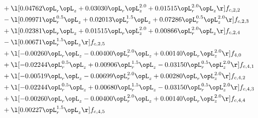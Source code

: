 \begin{alignat}{2}
& + \l[  0.04762 \opL_r \opL_z +  0.03030 \opL_r \opL_z^{2.0} +  0.01515 \opL_r^{2.0} \opL_z  \r] f_{c,2,2} \nonumber \\ 
& - \l[  0.09971 \opL_r^{0.5} \opL_z +  0.02013 \opL_r^{1.5} \opL_z +  0.07286 \opL_r^{0.5} \opL_z^{2.0}  \r] f_{c,2,3} \nonumber \\ 
& + \l[  0.02381 \opL_r \opL_z +  0.01515 \opL_r \opL_z^{2.0} +  0.00866 \opL_r^{2.0} \opL_z  \r] f_{c,2,4} \nonumber \\ 
& - \l[  0.00671 \opL_r^{1.5} \opL_z  \r] f_{c,2,5} \nonumber \\ 
& + \l[  -0.00260 \opL_r \opL_z   -0.00400 \opL_r^{2.0} \opL_z +  0.00140 \opL_r \opL_z^{2.0}  \r] f_{4,0} \nonumber \\ 
& + \l[  -0.02244 \opL_r^{0.5} \opL_z +  0.00906 \opL_r^{1.5} \opL_z   -0.03150 \opL_r^{0.5} \opL_z^{2.0}  \r] f_{c,4,1} \nonumber \\ 
& + \l[  -0.00519 \opL_r \opL_z   -0.00699 \opL_r^{2.0} \opL_z +  0.00280 \opL_r \opL_z^{2.0}  \r] f_{c,4,2} \nonumber \\ 
& + \l[  -0.02244 \opL_r^{0.5} \opL_z +  0.00680 \opL_r^{1.5} \opL_z   -0.03150 \opL_r^{0.5} \opL_z^{2.0}  \r] f_{c,4,3} \nonumber \\ 
& + \l[  -0.00260 \opL_r \opL_z   -0.00400 \opL_r^{2.0} \opL_z +  0.00140 \opL_r \opL_z^{2.0}  \r] f_{c,4,4} \nonumber \\ 
& + \l[  0.00227 \opL_r^{1.5} \opL_z  \r] f_{c,4,5} \nonumber \\ 
\end{alignat} 


